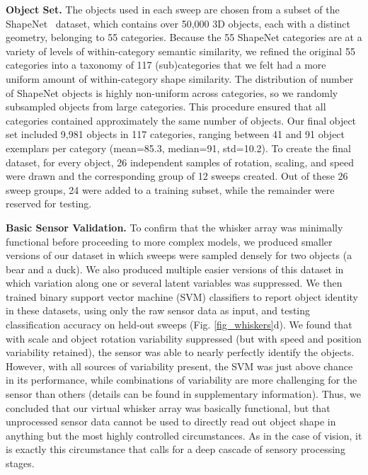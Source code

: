 \textbf{Object Set.} The objects used in each sweep are chosen from a subset of the ShapeNet~\cite{Chang2015} dataset, which contains over 50,000 3D objects, each with a distinct geometry, belonging to 55 categories.
Because the 55 ShapeNet categories are at a variety of levels of within-category semantic similarity, we refined the original 55 categories into a taxonomy of 117 (sub)categories that we felt had a more uniform amount of within-category shape similarity. 
The distribution of number of ShapeNet objects is highly non-uniform across categories, so we randomly subsampled objects from large categories.  
This procedure ensured that all categories contained approximately the same number of objects.  
Our final object set included 9,981 objects in 117 categories, ranging between 41 and 91 object exemplars per category (mean=85.3, median=91, std=10.2). 
To create the final dataset, for every object, 26 independent samples of rotation, scaling, and speed were drawn and the corresponding group of 12 sweeps created.   
Out of these 26 sweep groups, 24 were added to a training subset, while the remainder were reserved for testing.

\textbf{Basic Sensor Validation.} To confirm that the whisker array was minimally functional before proceeding to more complex models, we produced smaller versions of our dataset in which sweeps were sampled densely for two objects (a bear and a duck).  
We also produced multiple easier versions of this dataset in which variation along one or several latent variables was suppressed. 
We then trained binary support vector machine (SVM) classifiers to report object identity in these datasets, using only the raw sensor data as input, and testing classification accuracy on held-out sweeps (Fig. \ref{fig_whiskers}d).  We found that with scale and object rotation variability suppressed (but with speed and position variability retained), the sensor was able to nearly perfectly identify the objects.  
However, with all sources of variability present, the SVM was just above chance in its performance,  
while combinations of variability are more challenging for the sensor than others (details can be found in supplementary information). 
Thus, we concluded that our virtual whisker array was basically functional, but that unprocessed sensor data cannot be used to directly read out object shape in anything but the most highly controlled circumstances.
As in the case of vision, it is exactly this circumstance that calls for a deep cascade of sensory processing stages. 

